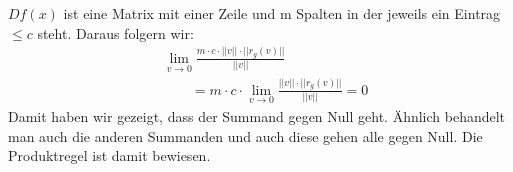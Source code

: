 $Df(x)$ ist eine Matrix mit einer Zeile und m Spalten in der jeweils ein Eintrag $\leq c$ steht. Daraus folgern wir:
\begin{align*}
&\lim\limits_{v \rightarrow 0} \frac{m \cdot c \cdot ||v|| \cdot ||r_{g}(v)||}{||v||}\\
&\qquad= m \cdot c \cdot \lim\limits_{v \rightarrow 0} \frac{ ||v|| \cdot ||r_{g}(v)||}{||v||} = 0
\end{align*} 
Damit haben wir gezeigt, dass der Summand gegen Null geht. Ähnlich behandelt man auch die anderen Summanden und auch diese gehen alle gegen Null.
Die Produktregel ist damit bewiesen. 













